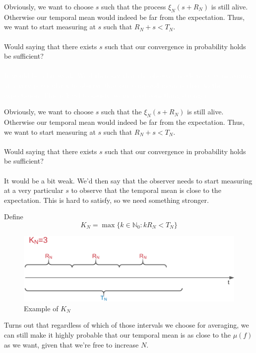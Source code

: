 \documentclass{beamer}
\begin{document}
\begin{frame}
    Obviously, we want to choose $s$ such that the process $\xi_N(s+R_N)$ is still alive. Otherwise our temporal mean would indeed be far from the expectation. Thus, we want to start measuring at
        $s$ such that $R_N + s < T_N$. \\~\\

        Would saying that there exists $s$ such that our convergence in probability holds be sufficient? \\~\\\textcolor{white}{It would be a bit weak. We'd then say that the observer needs to start measuring at a very particular $s$ to observe that our temporal mean is close to the expectation. This is hard to satisfy, so 
        we need something stronger.}
\end{frame}
\begin{frame}
    Obviously, we want to choose $s$ such that the $\xi_N(s+R_N)$ is still alive. Otherwise our temporal mean would indeed be far from the expectation. Thus, we want to start measuring at
        $s$ such that $R_N + s < T_N$. \\~\\

        Would saying that there exists $s$ such that our convergence in probability holds be sufficient? \\~\\

       It would be a bit weak. We'd then say that the observer needs to start measuring at a very particular $s$ to observe that the temporal mean is close to the expectation. 
       This is hard to satisfy, so 
        we need something stronger.
\end{frame}

\begin{frame}
    Define 
    \[K_N = \max\{k \in \mathbb{N}_0: kR_N < T_N\}\]
    \begin{figure}[H]
        \centering
        \includegraphics[scale=0.2]{./img/kn_rn.png}
        \caption{Example of $K_N$}
        \label{fig:kn_rn}
    \end{figure}
    Turns out that regardless of which of those intervals we choose for averaging, we can still make it highly probable that our temporal mean is as close to the $\mu(f)$ 
    as we want, given that we're free to increase $N$. 
\end{frame}
\end{document}
